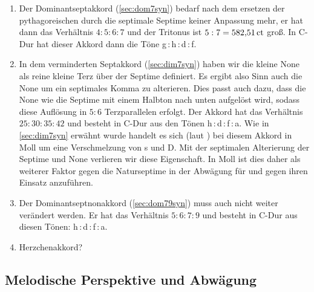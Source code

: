 \begin{enumerate}
  \item Der Dominantseptakkord (\cref{sec:dom7syn}) bedarf nach dem ersetzen der
  pythagoreischen durch die septimale Septime keiner Anpassung mehr, er hat dann
  das Verhältnis $4:5:6:7$ und der Tritonus ist $5:7 = 582{,}51\,\text{ct}$ groß. In
  C-Dur hat dieser Akkord dann die Töne g\,:\,\naturalm h\,:\,d\,:\,\septimal f.
  \item In dem verminderten Septakkord (\cref{sec:dim7syn}) haben wir die kleine
  None als reine kleine Terz über der Septime definiert. Es ergibt also Sinn
  auch die None um ein septimales Komma zu alterieren. Dies passt auch dazu,
  dass die None wie die Septime mit einem Halbton nach unten aufgelöst wird,
  sodass diese Auflösung in $5:6$ Terzparallelen erfolgt. Der Akkord hat das
  Verhältnis $25:30:35:42$ und besteht in C-Dur aus den Tönen
  \naturalm h\,:\,d\,:\,\septimal f\,:\,\septimal\flatp a. Wie in
  \cref{sec:dim7syn} erwähnt wurde handelt es sich (laut
  \cite[S.\,92ff.]{deLaMotte}) bei diesem Akkord in Moll um eine Verschmelzung
  von s und D. Mit der septimalen Alterierung der Septime und None verlieren wir
  diese Eigenschaft. In Moll ist dies daher als weiterer Faktor gegen die
  Naturseptime in der Abwägung für und gegen ihren Einsatz anzuführen.
  \item Der Dominantseptnonakkord (\cref{sec:dom79syn}) muss auch nicht weiter
  verändert werden. Er hat das Verhältnis $5:6:7:9$ und besteht in C-Dur aus
  diesen Tönen: \naturalm h\,:\,d\,:\,\septimal f\,:\,a.
  \item Herzchenakkord?
\end{enumerate}

\subsection{Melodische Perspektive und Abwägung}

